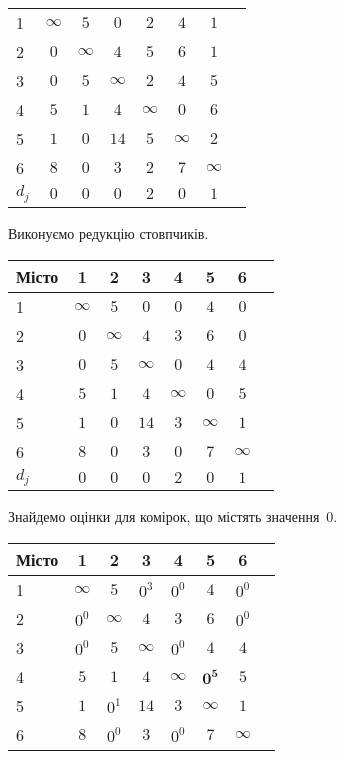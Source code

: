 \documentclass[a4paper,oneside,DIV=12,12pt]{scrartcl}
\begin{document}
\begin{solution}
\begin{longtable}[c]{lccccccr}
				1     & $\infty$ & $5$      & $0$      & $2$      & $4$      & $1$\\
				2     & $0$      & $\infty$ & $4$      & $5$      & $6$      & $1$\\
				3     & $0$      & $5$      & $\infty$ & $2$      & $4$      & $5$\\
				4     & $5$      & $1$      & $4$      & $\infty$ & $0$      & $6$\\
				5     & $1$      & $0$      & $14$     & $5$      & $\infty$ & $2$\\
				6     & $8$      & $0$      & $3$      & $2$      & $7$      & $\infty$\\
				$d_j$ & $0$      & $0$      & $0$      & $2$      & $0$      & $1$\\
		\end{longtable}
		
		Виконуємо редукцію стовпчиків.
		\begin{longtable}[c]{lccccccr}
			\toprule
				Місто & 1 & 2 & 3 & 4 & 5 & 6\\
			\midrule
			\endhead
			\bottomrule
			\endfoot
			
				1     & $\infty$ & $5$      & $0$      & $0$      & $4$      & $0$\\
				2     & $0$      & $\infty$ & $4$      & $3$      & $6$      & $0$\\
				3     & $0$      & $5$      & $\infty$ & $0$      & $4$      & $4$\\
				4     & $5$      & $1$      & $4$      & $\infty$ & $0$      & $5$\\
				5     & $1$      & $0$      & $14$     & $3$      & $\infty$ & $1$\\
				6     & $8$      & $0$      & $3$      & $0$      & $7$      & $\infty$\\
				$d_j$ & $0$      & $0$      & $0$      & $2$      & $0$      & $1$\\
		\end{longtable}
		
		Знайдемо оцінки для комірок, що містять значення~$0$.
		
		\begin{longtable}[c]{lccccccr}
			\toprule
				Місто & 1 & 2 & 3 & 4 & 5 & 6\\
			\midrule
			\endhead
			\bottomrule
			\endfoot
			
				1     & $\infty$ & $5$      & $0^3$    & $0^0$    & $4$            & $0^0$\\
				2     & $0^0$    & $\infty$ & $4$      & $3$      & $6$            & $0^0$\\
				3     & $0^0$    & $5$      & $\infty$ & $0^0$    & $4$            & $4$\\
				4     & $5$      & $1$      & $4$      & $\infty$ & $\mathbf{0^5}$ & $5$\\
				5     & $1$      & $0^1$    & $14$     & $3$      & $\infty$       & $1$\\
				6     & $8$      & $0^0$    & $3$      & $0^0$    & $7$            & $\infty$\\
		\end{longtable}
		

\end{solution}
\end{document}

